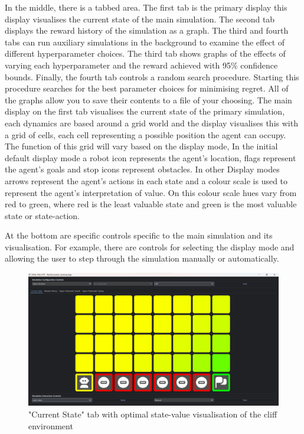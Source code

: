 \documentclass[]{final_report}
\begin{document}
In the middle, there is a tabbed area. The first tab is the primary display this display visualises the current state of the main simulation. The second tab displays the reward history of the simulation as a graph. The third and fourth tabs can run auxiliary simulations in the background to examine the effect of different hyperparameter choices. The third tab shows graphs of the effects of varying each hyperparameter and the reward achieved with 95\% confidence bounds. Finally, the fourth tab controls a random search procedure. Starting this procedure searches for the best parameter choices for minimising regret. All of the graphs allow you to save their contents to a file of your choosing. 
\newpage
The main display on the first tab visualises the current state of the primary simulation, each dynamics are based around a grid world and the display visualises this with a grid of cells, each cell representing a possible position the agent can occupy. The function of this grid will vary based on the display mode, In the initial default display mode a robot icon represents the agent's location, flags represent the agent's goals and stop icons represent obstacles. In other Display modes arrows represent the agent's actions in each state and a colour scale is used to represent the agent's interpretation of value. On this colour scale hues vary from red to green, where red is the least valuable state and green is the most valuable state or state-action.

At the bottom are specific controls specific to the main simulation and its visualisation. For example, there are controls for selecting the display mode and allowing the user to step through the simulation manually or automatically. 


\begin{figure}[H]
  \centering
  
  \includegraphics[trim={0 0 0 6mm},clip,width=\textwidth]{ui-screenshots/state-value-2.png}
  
  \caption{\label{fig:screenshot:current-state} "Current State" tab with optimal state-value visualisation of the cliff environment}
\end{figure}
\end{document}
